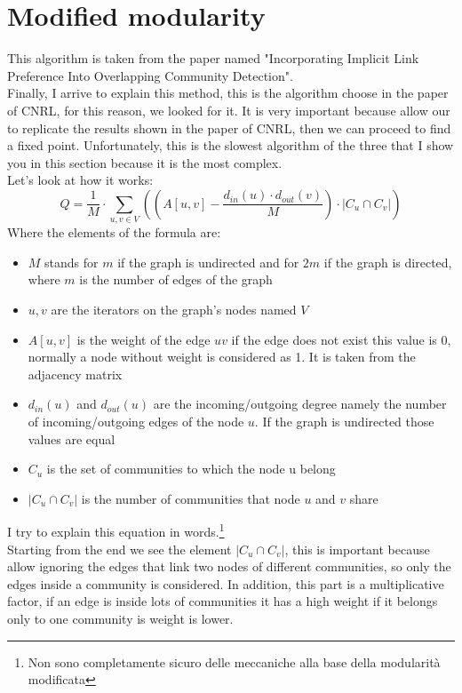 \documentclass[epsfig,a4paper,11pt,titlepage,twoside,openany]{book}
\begin{document}
\section{Modified modularity}
This algorithm is taken from the paper named "Incorporating Implicit Link Preference Into Overlapping Community Detection".\\
Finally, I arrive to explain this method, this is the algorithm choose in the paper of CNRL, for this reason, we looked for it. It is very important because allow our to replicate the results shown in the paper of CNRL, then we can proceed to find a fixed point. Unfortunately, this is the slowest algorithm of the three that I show you in this section because it is the most complex.\\
Let's look at how it works:
\begin{equation}
	Q = \frac{1}{M} \cdot \sum_{u,v \in V}
		\left(
			\left( A \left[ u,v \right] - \frac{ d_{in}\left(u\right) \cdot d_{out}\left(v\right) }{M} \right)
			\cdot
			|C_u \cap C_v| 
		\right)
	\label{eq:m_mod}
\end{equation}
Where the elements of the formula are:
\begin{itemize}
	\item $M$ stands for $m$ if the graph is undirected and for $2m$ if the graph is directed, where $m$ is the number of edges of the graph
	\item $u,v$ are the iterators on the graph's nodes named $V$
	\item $A \left[ u,v \right]$ is the weight of the edge $uv$ if the edge does not exist this value is 0, normally a node without weight is considered as 1. It is taken from the adjacency matrix
	\item $d_{in}\left(u\right)$ and $d_{out}\left(u\right)$ are the incoming/outgoing degree namely the number of incoming/outgoing edges of the node $u$. If the graph is undirected those values are equal
	\item $C_u$ is the set of communities to which the node u belong
	\item $|C_u \cap C_v|$ is the number of communities that node $u$ and $v$ share
\end{itemize}
I try to explain this equation in words.\footnote{Non sono completamente sicuro delle meccaniche alla base della modularità modificata}\\
Starting from the end we see the element $\displaystyle |C_u \cap C_v|$, this is important because allow ignoring the edges that link two nodes of different communities, so only the edges inside a community is considered. In addition, this part is a multiplicative factor, if an edge is inside lots of communities it has a high weight if it belongs only to one community is weight is lower.\\
\end{document}
